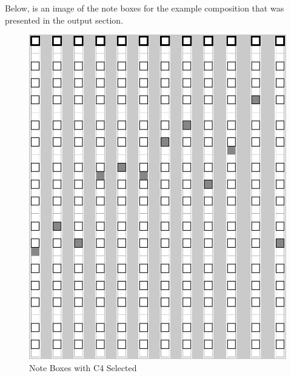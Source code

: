 \vspace{\baselineskip}

Below, is an image of the note boxes for the example composition that was presented in the output section.

\begin{figure}[!htbp]
	\centering
	\caption{Note Boxes with C4 Selected}
	\includegraphics[scale=0.45]{images/noteBoxes.png}
\end{figure}